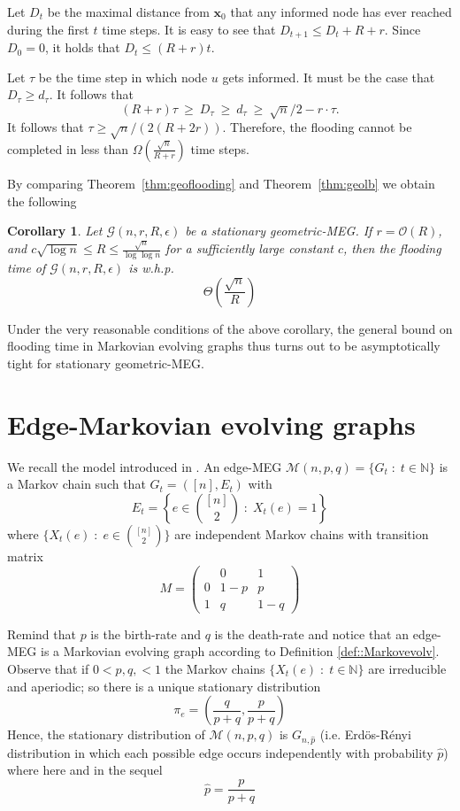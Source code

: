 \documentclass[10pt,a4paper]{article}
\newtheorem{cor}[definition]{Corollary}
\newcommand{\qed}{\hspace{\stretch{1}$\square$}}
\begin{document}
\noindent Let $D_t$ be the maximal distance from  $\mathbf{x}_0$  that any informed node has ever reached during the first $t$ time steps. It is easy to see that $D_{t+1} \leqslant D_t + R + r$. Since $D_0 = 0$, it holds that $D_t \leqslant (R + r)t$.

\noindent Let $\tau$ be the time step in which node $u$ gets informed. It must be the case that $D_\tau \geqslant d_\tau$. It follows that
$$
(R + r)\tau \ \geqslant\  D_\tau \ \geqslant\  d_\tau\ \geqslant\  \sqrt{n}/2 - r\cdot \tau.
$$
It follows that $\tau \geqslant  \sqrt{n}/ (2(R + 2r))$. Therefore, the flooding cannot be completed
in less than $\Omega\left(\frac{\sqrt{n}}{R + r}\right)$ time steps.
\qed


\noindent By comparing Theorem~\ref{thm:geoflooding} and Theorem~\ref{thm:geolb} we obtain the following

\begin{cor}\label{cor:geotight}
Let $\mathcal{G}(n, r, R, \epsilon)$ be a stationary geometric-MEG. If  $r =
\mathcal{O}(R)$, and $c\sqrt{\log n} \leqslant R \leqslant \frac{\sqrt{n}}{\log\log n}$ for a
sufficiently large constant $c$, then the  flooding time of $\mathcal{G}(n, r, R, \epsilon)$ is w.h.p.
$$
\Theta\left(\frac{\sqrt{n}}{R}\right)
$$
\end{cor}


\noindent Under the very reasonable conditions of the above corollary, the general bound on flooding time in Markovian evolving graphs thus turns out to be asymptotically tight for stationary geometric-MEG.


\section{Edge-Markovian evolving graphs}\label{sec::edge}
We recall the model introduced in \cite{CMMPS08,W80}. An edge-MEG $\mathcal{M}(n,p,q)=  \{G_t  \;:\;
t \in \mathbb{N} \}$ is a Markov chain such that  $ G_t = ([n],E_t)$ with
\[
E_t =  \left\{ e \in \binom{[n]}{2} \;:\; X_t(e) = 1 \right\}
\]
where    $\{X_t(e) \;:\; e \in \binom{[n]}{2} \}$ are independent Markov chains  with transition matrix
\[
M = \left(
\begin{array}{c|cc}
& 0 & 1 \\[1mm]
\hline
0 & 1 - p & p \\[2mm]
1 & q & 1 - q
\end{array}
\right)
\]

\noindent Remind that $p$ is the birth-rate and $q$ is the death-rate and notice that an edge-MEG is a Markovian evolving  graph according to Definition \ref{def::Markovevolv}. Observe that if $0 < p,q, < 1$ the Markov chains $\{X_t(e) \;:\;  t \in \mathbb{N} \}$ are irreducible and aperiodic; so there is a unique stationary distribution
\[
\pi_e=\left(\frac{q}{p+q},\frac{p}{p+q}\right)
\]
Hence, the stationary distribution of $\mathcal{M}(n,p,q)$ is $G_{n,\hat{p}}$ (i.e. Erd\"os-R\'enyi distribution in which each possible edge occurs independently with probability $\hat{p}$) where here and in the sequel
$$
\hat{p}=\frac{p}{p+q}
$$
\end{document}

